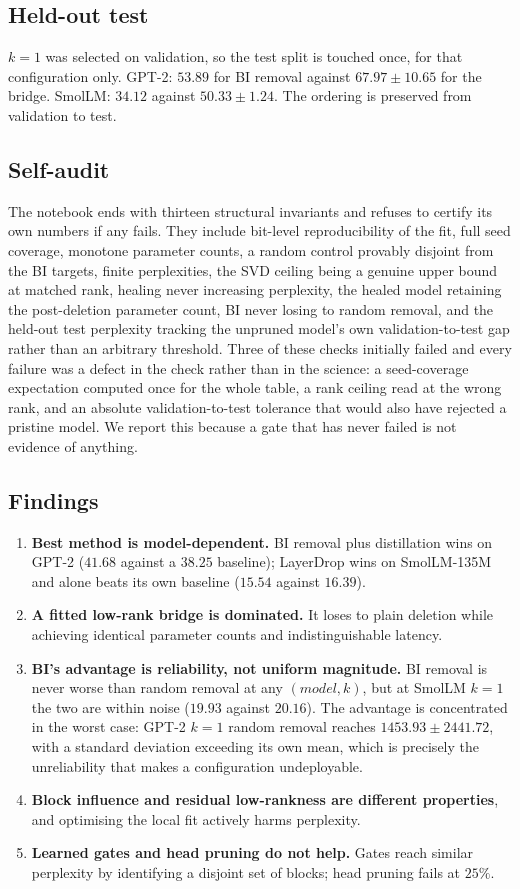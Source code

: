 \documentclass[11pt]{article}
\begin{document}
\subsection{Held-out test}
$k=1$ was selected on validation, so the test split is touched once, for that
configuration only. GPT-2: $53.89$ for BI removal against $67.97\pm10.65$ for
the bridge. SmolLM: $34.12$ against $50.33\pm1.24$. The ordering is preserved
from validation to test.

\subsection{Self-audit}\label{sec:gate}
The notebook ends with thirteen structural invariants and refuses to certify
its own numbers if any fails. They include bit-level reproducibility of the
fit, full seed coverage, monotone parameter counts, a random control provably
disjoint from the BI targets, finite perplexities, the SVD ceiling being a
genuine upper bound at matched rank, healing never increasing perplexity, the
healed model retaining the post-deletion parameter count, BI never losing to
random removal, and the held-out test perplexity tracking the unpruned model's
own validation-to-test gap rather than an arbitrary threshold. Three of these
checks initially failed and every failure was a defect in the check rather than
in the science: a seed-coverage expectation computed once for the whole table,
a rank ceiling read at the wrong rank, and an absolute validation-to-test
tolerance that would also have rejected a pristine model. We report this
because a gate that has never failed is not evidence of anything.

\subsection{Findings}
\begin{enumerate}
\item \textbf{Best method is model-dependent.} BI removal plus distillation
wins on GPT-2 ($41.68$ against a $38.25$ baseline); LayerDrop wins on
SmolLM-135M and alone beats its own baseline ($15.54$ against $16.39$).
\item \textbf{A fitted low-rank bridge is dominated.} It loses to plain
deletion while achieving identical parameter counts and indistinguishable
latency.
\item \textbf{BI's advantage is reliability, not uniform magnitude.} BI
removal is never worse than random removal at any $(model,k)$, but at SmolLM
$k=1$ the two are within noise ($19.93$ against $20.16$). The advantage is
concentrated in the worst case: GPT-2 $k=1$ random removal reaches
$1453.93\pm2441.72$, with a standard deviation exceeding its own mean, which is
precisely the unreliability that makes a configuration undeployable.
\item \textbf{Block influence and residual low-rankness are different
properties}, and optimising the local fit actively harms perplexity.
\item \textbf{Learned gates and head pruning do not help.} Gates reach
similar perplexity by identifying a disjoint set of blocks; head pruning
fails at $25\%$.
\end{enumerate}
\end{document}
